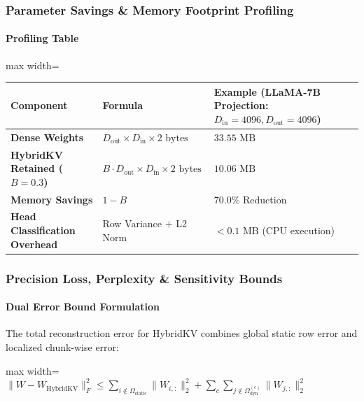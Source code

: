 \subsubsection*{Parameter Savings \& Memory Footprint Profiling}

\paragraph{Profiling Table}

\begin{center}
\begin{adjustbox}{max width=\columnwidth}
\renewcommand{\arraystretch}{1.2}
\begin{tabular}{lll}
\toprule
Component & Formula & Example (LLaMA-7B Projection: $D_{\text{in}}=4096, D_{\text{out}}=4096$) \\
\midrule
\textbf{Dense Weights} & $D_{\text{out}} \times D_{\text{in}} \times 2 \text{ bytes}$ & $33.55 \text{ MB}$ \\
\textbf{HybridKV Retained ($B=0.3$)} & $B \cdot D_{\text{out}} \times D_{\text{in}} \times 2 \text{ bytes}$ & $10.06 \text{ MB}$ \\
\textbf{Memory Savings} & $1 - B$ & $\mathbf{70.0\%}$ Reduction \\
\textbf{Head Classification Overhead} & Row Variance $+$ L2 Norm & $< 0.1 \text{ MB}$ (CPU execution) \\

\bottomrule
\end{tabular}
\end{adjustbox}
\end{center}

\subsubsection*{Precision Loss, Perplexity \& Sensitivity Bounds}

\paragraph{Dual Error Bound Formulation}

The total reconstruction error for HybridKV combines global static row error and localized chunk-wise error:

\begin{center}
\begin{adjustbox}{max width=\columnwidth}
$\displaystyle
\| W - W_{\text{HybridKV}} \|_F^2 \le \sum_{i \notin \Omega_{\text{static}}} \| W_{i, :} \|_2^2 + \sum_{c} \sum_{j \notin \Omega_{\text{dyn}}^{(c)}} \| W_{j, :} \|_2^2
$
\end{adjustbox}
\end{center}

